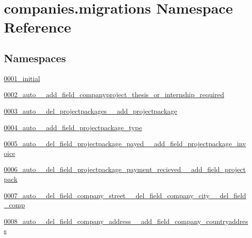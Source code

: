 \hypertarget{namespacecompanies_1_1migrations}{\section{companies.\-migrations Namespace Reference}
\label{namespacecompanies_1_1migrations}
}
\subsection*{Namespaces}
\begin{DoxyCompactItemize}
\item 
\hyperlink{namespacecompanies_1_1migrations_1_10001__initial}{0001\-\_\-initial}
\item 
\hyperlink{namespacecompanies_1_1migrations_1_10002__auto____add__field__companyproject__thesis__or__internship__required}{0002\-\_\-auto\-\_\-\-\_\-add\-\_\-field\-\_\-companyproject\-\_\-thesis\-\_\-or\-\_\-internship\-\_\-required}
\item 
\hyperlink{namespacecompanies_1_1migrations_1_10003__auto____del__projectpackages____add__projectpackage}{0003\-\_\-auto\-\_\-\-\_\-del\-\_\-projectpackages\-\_\-\-\_\-add\-\_\-projectpackage}
\item 
\hyperlink{namespacecompanies_1_1migrations_1_10004__auto____add__field__projectpackage__type}{0004\-\_\-auto\-\_\-\-\_\-add\-\_\-field\-\_\-projectpackage\-\_\-type}
\item 
\hyperlink{namespacecompanies_1_1migrations_1_10005__auto____del__field__projectpackage__payed____add__field__projectpackage__invoice}{0005\-\_\-auto\-\_\-\-\_\-del\-\_\-field\-\_\-projectpackage\-\_\-payed\-\_\-\-\_\-add\-\_\-field\-\_\-projectpackage\-\_\-invoice}
\item 
\hyperlink{namespacecompanies_1_1migrations_1_10006__auto____del__field__projectpackage__payment__recieved____add__field__projectpack}{0006\-\_\-auto\-\_\-\-\_\-del\-\_\-field\-\_\-projectpackage\-\_\-payment\-\_\-recieved\-\_\-\-\_\-add\-\_\-field\-\_\-projectpack}
\item 
\hyperlink{namespacecompanies_1_1migrations_1_10007__auto____del__field__company__street____del__field__company__city____del__field__comp}{0007\-\_\-auto\-\_\-\-\_\-del\-\_\-field\-\_\-company\-\_\-street\-\_\-\-\_\-del\-\_\-field\-\_\-company\-\_\-city\-\_\-\-\_\-del\-\_\-field\-\_\-comp}
\item 
\hyperlink{namespacecompanies_1_1migrations_1_10008__auto____del__field__company__address____add__field__company__countryaddress}{0008\-\_\-auto\-\_\-\-\_\-del\-\_\-field\-\_\-company\-\_\-address\-\_\-\-\_\-add\-\_\-field\-\_\-company\-\_\-countryaddress}

\end{DoxyCompactItemize}
